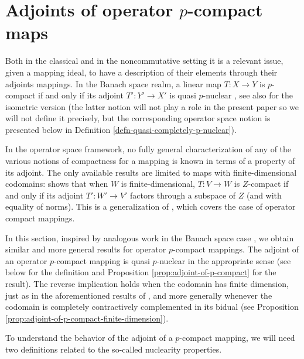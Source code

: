 \documentclass[11pt]{amsart}
\numberwithin{equation}{section}
\begin{document}
\section{Adjoints of operator $p$-compact maps}\label{sec-adjoints}

Both in the classical and in the noncommutative setting it is a relevant issue, given a mapping ideal, to have a description of their elements through their adjoints mappings.
In the Banach space realm, a linear map $T : X \to Y$ is $p$-compact if and only if its adjoint $T' : Y' \to X'$ is quasi $p$-nuclear \cite[Prop. 3.8]{Delgado-Pineiro-Serrano-adjoints}, see also \cite[Cor. 2.7]{Galicer-Lassalle-Turco} for the isometric version (the latter notion will not play a role in the present paper so we will not define it precisely, but the corresponding operator space notion is presented below in Definition \ref{defn-quasi-completely-p-nuclear}).


In the operator space framework, no fully general characterization of any of the various notions of compactness for a mapping is known in terms of a property of its adjoint.
The only available results are limited to maps with finite-dimensional codomains: \cite[Thm. 4.3]{Yew} shows that when $W$ is finite-dimensional, $T : V \to W$ is $Z$-compact if and only if its adjoint $T': W'\to V'$ factors through a subspace of $Z$ (and with equality of norms). This is a generalization of \cite[Cor. 4.15]{Oikhberg-Thesis}, which covers the case of operator compact mappings.

In this section, inspired by analogous work in the Banach space case \cite{Delgado-Pineiro-Serrano-adjoints}, we obtain similar and more general results for operator $p$-compact mappings.
The adjoint of an operator $p$-compact mapping is quasi $p$-nuclear in the appropriate sense  (see below for the definition and Proposition \ref{prop:adjoint-of-p-compact} for the result).
The reverse implication holds when the codomain has finite dimension, just as in the aforementioned results of \cite{Oikhberg-Thesis,Yew}, and more generally whenever the codomain is completely contractively complemented in its bidual (see Proposition \ref{prop:adjoint-of-p-compact-finite-dimension}).



To understand the behavior of the adjoint of a $p$-compact mapping, we will need two definitions related to the so-called nuclearity properties.
\end{document}
